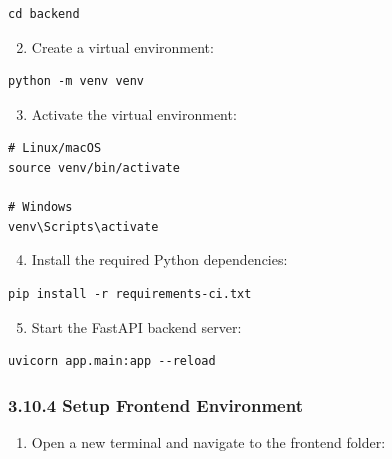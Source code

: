 \documentclass[12pt,a4paper,oneside]{report}
\begin{document}
\begin{verbatim}
cd backend
\end{verbatim}

\begin{enumerate}[leftmargin=2em]
    \setcounter{enumi}{1}
    \item Create a virtual environment:
\end{enumerate}

\begin{verbatim}
python -m venv venv
\end{verbatim}

\begin{enumerate}[leftmargin=2em]
    \setcounter{enumi}{2}
    \item Activate the virtual environment:
\end{enumerate}

\begin{verbatim}
# Linux/macOS
source venv/bin/activate

# Windows
venv\Scripts\activate
\end{verbatim}

\begin{enumerate}[leftmargin=2em]
    \setcounter{enumi}{3}
    \item Install the required Python dependencies:
\end{enumerate}

\begin{verbatim}
pip install -r requirements-ci.txt
\end{verbatim}

\begin{enumerate}[leftmargin=2em]
    \setcounter{enumi}{4}
    \item Start the FastAPI backend server:
\end{enumerate}

\begin{verbatim}
uvicorn app.main:app --reload
\end{verbatim}

\subsubsection*{3.10.4 Setup Frontend Environment}

\begin{enumerate}[leftmargin=2em]
    \item Open a new terminal and navigate to the frontend folder:
\end{enumerate}
\end{document}
